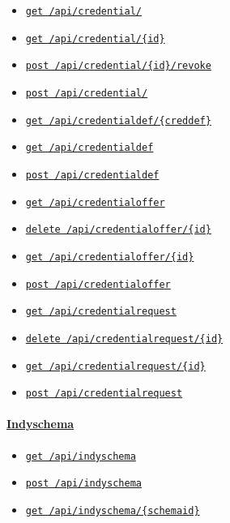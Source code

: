 \begin{itemize}
\tightlist
\item
  \protect\hyperlink{apiCredentialGet}{\texttt{get\ /api/credential/}}
\item
  \protect\hyperlink{apiCredentialIdGet}{\texttt{get\ /api/credential/\{id\}}}
\item
  \protect\hyperlink{apiCredentialIdRevokePost}{\texttt{post\ /api/credential/\{id\}/revoke}}
\item
  \protect\hyperlink{apiCredentialPost}{\texttt{post\ /api/credential/}}
\item
  \protect\hyperlink{apiCredentialdefCreddefGet}{\texttt{get\ /api/credentialdef/\{creddef\}}}
\item
  \protect\hyperlink{apiCredentialdefGet}{\texttt{get\ /api/credentialdef}}
\item
  \protect\hyperlink{apiCredentialdefPost}{\texttt{post\ /api/credentialdef}}
\item
  \protect\hyperlink{apiCredentialofferGet}{\texttt{get\ /api/credentialoffer}}
\item
  \protect\hyperlink{apiCredentialofferIdDelete}{\texttt{delete\ /api/credentialoffer/\{id\}}}
\item
  \protect\hyperlink{apiCredentialofferIdGet}{\texttt{get\ /api/credentialoffer/\{id\}}}
\item
  \protect\hyperlink{apiCredentialofferPost}{\texttt{post\ /api/credentialoffer}}
\item
  \protect\hyperlink{apiCredentialrequestGet}{\texttt{get\ /api/credentialrequest}}
\item
  \protect\hyperlink{apiCredentialrequestIdDelete}{\texttt{delete\ /api/credentialrequest/\{id\}}}
\item
  \protect\hyperlink{apiCredentialrequestIdGet}{\texttt{get\ /api/credentialrequest/\{id\}}}
\item
  \protect\hyperlink{apiCredentialrequestPost}{\texttt{post\ /api/credentialrequest}}
\end{itemize}

\hypertarget{indyschema}{%
\paragraph{\texorpdfstring{\protect\hyperlink{Indyschema}{Indyschema}}{Indyschema}}\label{indyschema}}

\begin{itemize}
\tightlist
\item
  \protect\hyperlink{apiIndyschemaGet}{\texttt{get\ /api/indyschema}}
\item
  \protect\hyperlink{apiIndyschemaPost}{\texttt{post\ /api/indyschema}}
\item
  \protect\hyperlink{apiIndyschemaSchemaidGet}{\texttt{get\ /api/indyschema/\{schemaid\}}}
\end{itemize}

